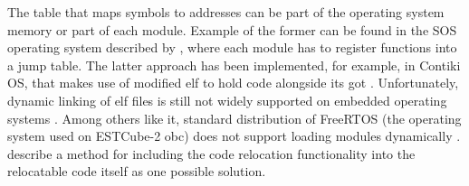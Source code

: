 The table that maps symbols to addresses can be part of the operating system memory or part of each module. Example of the former can be found in the SOS operating system described by \textcite{Han2005}, where each module has to register functions into a jump table. The latter approach has been implemented, for example, in Contiki OS, that makes use of modified \gls{elf} to hold code alongside its \gls{got} \cite{Dunkels2006}. Unfortunately, dynamic linking of \gls{elf} files is still not widely supported on embedded operating systems \cite{Xinyu2017}. Among others like it, standard distribution of FreeRTOS (the operating system used on ESTCube-2 \gls{obc}) does not support loading modules dynamically \cite{Barry2005}. \textcite{Xinyu2017} describe a method for including the code relocation functionality into the relocatable code itself as one possible solution.
